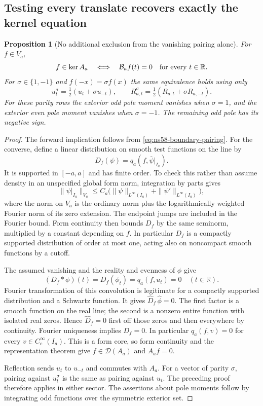 \documentclass[11pt]{article}
\newtheorem{proposition}[theorem]{Proposition}
\theoremstyle{remark}
\begin{document}
\subsection*{Testing every translate recovers exactly the kernel equation}

\begin{proposition}[No additional exclusion from the vanishing pairing alone]
\label{prop:ns58-equivalence}
For $f\in V_a$,
\begin{equation}\label{eq:ns58-equivalence}
 f\in\ker A_a
 \quad\Longleftrightarrow\quad
 \mathcal B_a f(t)=0\quad\hbox{for every }t\in\mathbb R.
\end{equation}
For $\sigma\in\{1,-1\}$ and $f(-x)=\sigma f(x)$ the same
equivalence holds using only
\[
 u_t^\sigma=\tfrac12(u_t+\sigma u_{-t}),\qquad
 R_{a,t}^\sigma=\tfrac12(R_{a,t}+\sigma R_{a,-t}).
\]
For these parity rows the exterior odd pole moment vanishes when
$\sigma=1$, and the exterior even pole moment vanishes when
$\sigma=-1$. The remaining odd pole has its negative sign.
\end{proposition}
\begin{proof}
The forward implication follows from
\eqref{eq:ns58-boundary-pairing}. For the converse, define a linear
distribution on smooth test functions on the line by
\[
 D_f(\psi)=q_a(f,\overline{\psi}|_{I_a}).
\]
It is supported in $[-a,a]$ and has finite order. To check this rather
than assume density in an unspecified global form norm, integration
by parts gives
\[
 \|\psi|_{I_a}\|_{V_a}
 \le C_a\bigl(\|\psi\|_{L^\infty(I_a)}
                +\|\psi'\|_{L^\infty(I_a)}\bigr),
\]
where the norm on $V_a$ is the ordinary norm plus the logarithmically
weighted Fourier norm of its zero extension. The endpoint jumps are
included in the Fourier bound. Form continuity then bounds $D_f$
by the same seminorm, multiplied by a constant depending on $f$.
In particular $D_f$ is a compactly supported distribution of order
at most one, acting also on noncompact smooth functions by a cutoff.

The assumed vanishing and the reality and evenness of $\phi$ give
\[
 (D_f*\phi)(t)=D_f(\phi_t)=q_a(f,u_t)=0\quad(t\in\mathbb R).
\]
Fourier transformation of this convolution is legitimate for a
compactly supported distribution and a Schwartz function. It gives
$\widehat D_f\,\widehat\phi=0$. The first factor is a smooth
function on the real line; the second is a nonzero entire function
with isolated real zeros. Hence $\widehat D_f=0$ first off those
zeros and then everywhere by continuity. Fourier uniqueness implies
$D_f=0$. In particular $q_a(f,v)=0$ for every
$v\in C_c^\infty(I_a)$. This is a form core, so form continuity
and the representation theorem give $f\in\mathcal D(A_a)$ and
$A_af=0$.

Reflection sends $u_t$ to $u_{-t}$ and commutes with $A_a$.
For a vector of parity $\sigma$, pairing against $u_t^\sigma$
is the same as pairing against $u_t$. The preceding proof therefore
applies in either sector. The assertions about pole moments follow
by integrating odd functions over the symmetric exterior set.
\end{proof}
\end{document}
